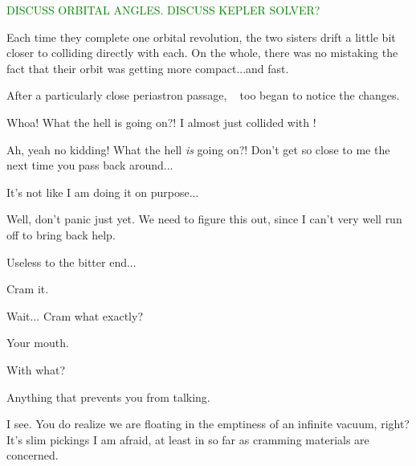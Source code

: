 \documentclass[main.tex]{subfiles}
\begin{document}
\begin{tcolorbox}[sharp corners, colback=green!30, colframe=green!80!blue, title=Orbital Dynamics IIc]
\par \textcolor{green}{DISCUSS ORBITAL ANGLES. DISCUSS KEPLER SOLVER?}
\end{tcolorbox}

\par \nar Each time they complete one orbital revolution, the two sisters drift a little bit closer to colliding directly with each.  On the whole, there was no mistaking the fact that their orbit was getting more compact...and fast.

\par \nar After a particularly close periastron passage, \rmtaygete~ too began to notice the changes.

\par \Taygete  Whoa!  What the hell is going on?!  I almost just collided with \rmalcyone!

\par \Alcyone Ah, yeah no kidding!  What the hell \textit{is} going on?!  Don't get so close to me the next time you pass back around...

\par \Taygete It's not like I am doing it on purpose...

\par \Celaeno  Well, don't panic just yet.  We need to figure this out, since I can't very well run off to bring back help.

\par \Alcyone Useless to the bitter end...

\par \Celaeno Cram it.  

\par \Alcyone Wait... Cram what exactly?

\par \Celaeno Your mouth.  

\par \Alcyone With what?

\par \Celaeno Anything that prevents you from talking.  

\par \Alcyone I see.  You do realize we are floating in the emptiness of an infinite vacuum, right?  It's slim pickings I am afraid, at least in so far as cramming materials are concerned.
\end{document}
